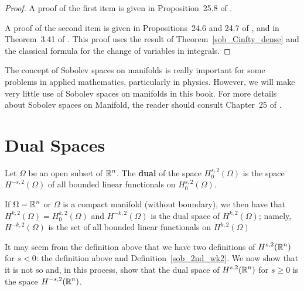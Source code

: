 
\begin{proof}
A proof of the first item is given in Proposition~25.8 of \cite{Tr}.

A proof of the second item is given in Propositions~24.6 and 24.7 of
\cite{Tr}, and in Theorem~3.41 of \cite{Ad}.
This proof uses the result of Theorem~\ref{sob_Cinfty_dense} and the
classical formula for the change of variables in integrals.
\end{proof}

The concept of Sobolev spaces on manifolds is really important for
some problems in applied mathematics, particularly in physics.
However, we will make very little use of Sobolev spaces on manifolds in this
book.  For more details about Sobolev spaces on Manifold, the reader
should consult Chapter~25 of \cite{Tr}.

\section{Dual Spaces} \label{sobDualSp}

\begin{defn}
Let $\Omega$ be an open subset of $\displaystyle \mathbb{R}^n$.  The
{\bfseries dual} of the space
$\displaystyle H^{s,2}_0(\Omega)$ is the space
$\displaystyle H^{-s,2}(\Omega)$ of all bounded
linear functionals on $\displaystyle H^{s,2}_0(\Omega)$.
\end{defn}

\begin{rmk}
If $\displaystyle \Omega = \mathbb{R}^n$ or $\Omega$ is a compact manifold
(without boundary), we then have
that $\displaystyle H^{k,2}(\Omega) = H^{k,2}_0(\Omega)$ and
$\displaystyle H^{-k,2}(\Omega)$ is
the dual space of $\displaystyle H^{k,2}(\Omega)$; namely,
$\displaystyle H^{-k,2}(\Omega)$ is the
set of all bounded linear functionals on $\displaystyle H^{k,2}(\Omega)$
\end{rmk}

It may seem from the definition above that we have two definitions
of $\displaystyle H^{s,2}(\mathbb{R}^n)$ for $s < 0$: the definition above
and Definition~\ref{sob_2nd_wk2}.  We now show that it is not so and,
in this process, show that the dual space of $\displaystyle H^{s,2}(\mathbb{R}^n)$
for $s\geq 0$ is the space $\displaystyle H^{-s,2}(\mathbb{R}^n)$.

